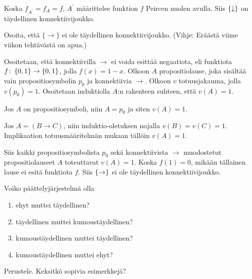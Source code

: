 \documentclass[11pt,a4paper]{amsart}
\begin{document}
\begin{solution}
Koska \(f_{A^{'}} = f_{A} = f\), \(A^{'}\) määrittelee funktion \(f\)
Peircen nuolen avulla. Siis \(\left\lbrace\downarrow\right\rbrace\) on täydellinen
konnektiivijoukko.
\end{solution}

\begin{exercise}
Osoita, että \(\{\rightarrow\}\) ei ole täydellinen konnektiivijoukko.
(Vihje: Eräästä viime viikon tehtävästä on apua.)
\end{exercise}

\begin{solution}
Osoitetaan, että konnektiivilla \(\to\) ei voida esittää negaatiota,
eli funktiota \(f \colon \left\lbrace0, 1\right\rbrace \to \left\lbrace0, 1\right\rbrace\), jolla
\(f(x) = 1 - x\). Olkoon \(A\) propositiolause, joka
sisältää vain propositiosymbolin \(p_0\) ja konnektiivia \(\to\).
Olkoon \(v\) totuusjakauma, jolla \(v(p_0) = 1\).
Osoitetaan induktiolla \(A\):n rakenteen suhteen, että \(v(A)=1\).

Jos \(A\) on propositiosymboli, niin \(A=p_0\) ja siten \(v(A) = 1\).

Jos \(A = (B \to C)\), niin induktio-oletuksen nojalla
\(v(B) = v(C) = 1\). Implikaation totuusmääritelmän mukaan tällöin
\(v(A) = 1\).

Siis kaikki propositiosymbolista \(p_0\) sekä konnektiivista \(\to\)
muodostetut propositiolauseet \(A\) toteuttavat \(v(A) = 1\).
Koska \(f(1)=0\), mikään tällainen lause ei esitä funktiota \(f\).
Siis \(\left\lbrace\to\right\rbrace\) ei ole täydellinen konnektiivijoukko.
\end{solution}

\begin{exercise}
Voiko päättelyjärjestelmä olla
\begin{enumerate}[label=\alph*), nosep]
\item ehyt muttei täydellinen?
\item täydellinen muttei kumoustäydellinen?
\item kumoustäydellinen muttei täydellinen?
\item kumoustäydellinen muttei ehyt?
\end{enumerate}
Perustele. Keksitkö sopivia esimerkkejä?
\end{exercise}
\end{document}

